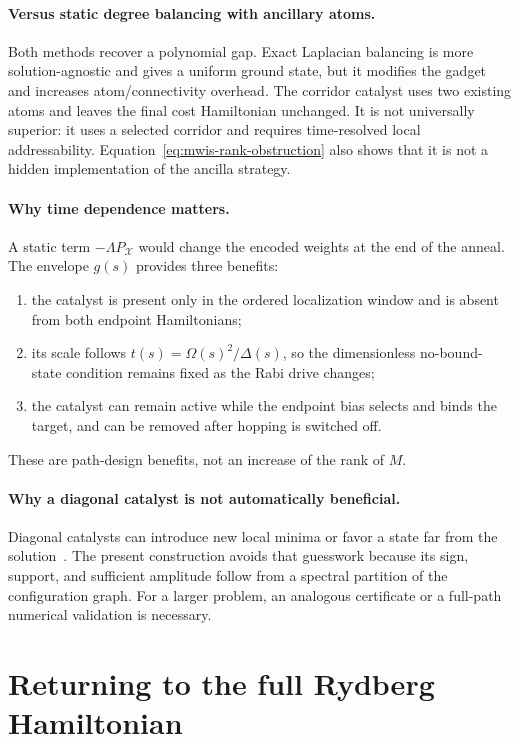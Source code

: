 \paragraph{Versus static degree balancing with ancillary atoms.}
Both methods recover a polynomial gap.  Exact Laplacian balancing is more
solution-agnostic and gives a uniform ground state, but it modifies the gadget
and increases atom/connectivity overhead.  The corridor catalyst uses two
existing atoms and leaves the final cost Hamiltonian unchanged.  It is not
universally superior: it uses a selected corridor and requires time-resolved
local addressability.  Equation~\eqref{eq:mwis-rank-obstruction} also shows
that it is not a hidden implementation of the ancilla strategy.

\paragraph{Why time dependence matters.}
A static term $-\Lambda P_{\mathcal X}$ would change the encoded weights at the
end of the anneal.  The envelope $g(s)$ provides three benefits:
\begin{enumerate}
 \item the catalyst is present only in the ordered localization window and is
 absent from both endpoint Hamiltonians;
 \item its scale follows $t(s)=\Omega(s)^2/\Delta(s)$, so the dimensionless
 no-bound-state condition remains fixed as the Rabi drive changes;
 \item the catalyst can remain active while the endpoint bias selects and
 binds the target, and can be removed after hopping is switched off.
\end{enumerate}
These are path-design benefits, not an increase of the rank of $M$.

\paragraph{Why a diagonal catalyst is not automatically beneficial.}
Diagonal catalysts can introduce new local minima or favor a state far from
the solution~\cite{albash2021diagonal}.  The present construction avoids that
guesswork because its sign, support, and sufficient amplitude follow from a
spectral partition of the configuration graph.  For a larger problem, an
analogous certificate or a full-path numerical validation is necessary.

\section{Returning to the full Rydberg Hamiltonian}
\label{sec:mwis-full-model-transfer}

